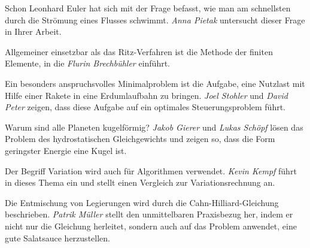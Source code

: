 Schon Leonhard Euler hat sich mit der Frage befasst, wie man 
am schnellsten durch die Strömung eines Flusses schwimmt.
\textit{Anna Pietak} untersucht dieser Frage in Ihrer Arbeit.

Allgemeiner einsetzbar als das Ritz-Verfahren ist die Methode
der finiten Elemente, in die \textit{Flurin Brechbühler} einführt.

Ein besonders anspruchsvolles Minimalproblem ist die Aufgabe,
eine Nutzlast mit Hilfe einer Rakete in eine Erdumlaufbahn zu
bringen.
\textit{Joel Stohler}
und
\textit{David Peter}
zeigen, dass diese Aufgabe auf ein optimales Steuerungsproblem
führt.

Warum sind alle Planeten kugelförmig?
\textit{Jakob Gierer}
und 
\textit{Lukas Schöpf}
lösen das Problem des hydrostatischen Gleichgewichts und
zeigen so, dass die Form geringster Energie eine Kugel ist.

Der Begriff Variation wird auch für Algorithmen verwendet.
\textit{Kevin Kempf} führt in dieses Thema ein und stellt
einen Vergleich zur Variationsrechnung an.

Die Entmischung von Legierungen wird durch die Cahn-Hilliard-Gleichung
beschrieben.
\textit{Patrik Müller} stellt den unmittelbaren Praxisbezug her,
indem er nicht nur die Gleichung herleitet, sondern auch auf
das Problem anwendet, eine gute Salatsauce herzustellen.







